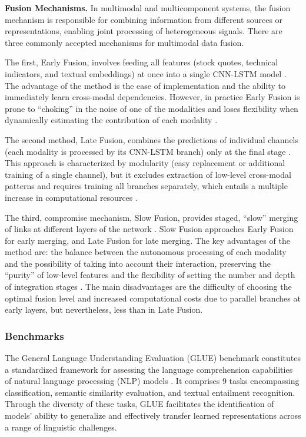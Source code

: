 \textbf{Fusion Mechanisms.} In multimodal and multicomponent systems, the fusion mechanism is responsible
for combining information from different sources or representations, enabling joint processing
of heterogeneous signals. There are three commonly accepted mechanisms for multimodal data fusion.

The first, Early Fusion, involves feeding all features (stock quotes, technical indicators, and textual embeddings)
at once into a single CNN-LSTM model \parencite{Karpathy_2014_CVPR, dutt2022shared}. The advantage of the method
is the ease of implementation and the ability to immediately learn cross-modal dependencies. However, in practice
Early Fusion is prone to “choking” in the noise of one of the modalities and loses flexibility when dynamically
estimating the contribution of each modality \parencite{dutt2022shared}.

The second method, Late Fusion, combines the predictions of individual channels (each modality is processed by its
CNN-LSTM branch) only at the final stage \parencite{Karpathy_2014_CVPR, ortega2019multimodal}. This approach is characterized
by modularity (easy replacement or additional training of a single channel), but it excludes extraction of low-level
cross-modal patterns and requires training all branches separately, which entails a multiple increase in computational
resources \parencite{joze2020mmtm}.

The third, compromise mechanism, Slow Fusion, provides staged, “slow” merging of links at different layers of the network
\parencite{feichtenhofer2016convolutional, dutt2022shared}. Slow Fusion approaches Early Fusion for early merging, and Late Fusion
for late merging. The key advantages of the method are: the balance between the autonomous processing of each modality
and the possibility of taking into account their interaction, preserving the “purity” of low-level features and
the flexibility of setting the number and depth of integration stages \parencite{Karpathy_2014_CVPR}. The main disadvantages
are the difficulty of choosing the optimal fusion level and increased computational costs due to parallel branches
at early layers, but nevertheless, less than in Late Fusion.

\subsubsection{Benchmarks}
\label{sec:benchmarks}
The General Language Understanding Evaluation (GLUE) benchmark constitutes a standardized framework for assessing the language comprehension
capabilities of natural language processing (NLP) models \parencite{wang2018GLUE}. It comprises 9 tasks encompassing classification, semantic
similarity evaluation, and textual entailment recognition. Through the diversity of these tasks, GLUE facilitates the identification
of models' ability to generalize and effectively transfer learned representations across a range of linguistic challenges.

